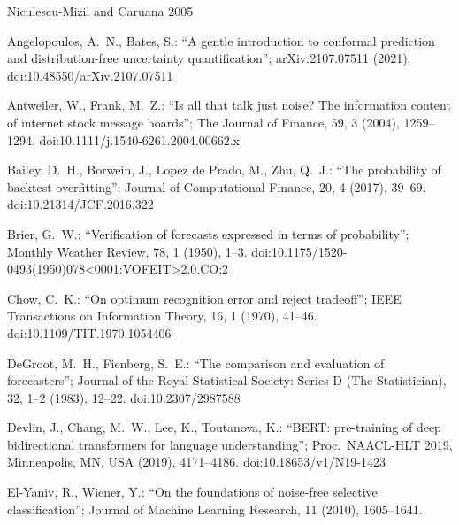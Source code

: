 \documentclass[10pt, a4paper, oneside]{article}
\theoremstyle{definition}
\theoremstyle{plain}
\begin{document}
{\fontsize{9}{11}\selectfont
\begin{thebibliography}{Niculescu-Mizil and Caruana 2005}
\setlength{\itemsep}{1pt}

Angelopoulos, A.\ N., Bates, S.: ``A gentle introduction to conformal prediction and
distribution-free uncertainty quantification''; arXiv:2107.07511 (2021).
doi:10.48550/arXiv.2107.07511

Antweiler, W., Frank, M.\ Z.: ``Is all that talk just noise? The information content of
internet stock message boards''; The Journal of Finance, 59, 3 (2004), 1259--1294.
doi:10.1111/j.1540-6261.2004.00662.x

Bailey, D.\ H., Borwein, J., Lopez de Prado, M., Zhu, Q.\ J.: ``The probability of
backtest overfitting''; Journal of Computational Finance, 20, 4 (2017), 39--69.
doi:10.21314/JCF.2016.322

Brier, G.\ W.: ``Verification of forecasts expressed in terms of probability''; Monthly
Weather Review, 78, 1 (1950), 1--3.
doi:10.1175/1520-0493(1950)078<0001:VOFEIT>2.0.CO;2

Chow, C.\ K.: ``On optimum recognition error and reject tradeoff''; IEEE Transactions
on Information Theory, 16, 1 (1970), 41--46. doi:10.1109/TIT.1970.1054406

DeGroot, M.\ H., Fienberg, S.\ E.: ``The comparison and evaluation of forecasters'';
Journal of the Royal Statistical Society: Series D (The Statistician), 32, 1--2 (1983),
12--22. doi:10.2307/2987588

Devlin, J., Chang, M.\ W., Lee, K., Toutanova, K.: ``BERT: pre-training of deep
bidirectional transformers for language understanding''; Proc.\ NAACL-HLT 2019,
Minneapolis, MN, USA (2019), 4171--4186. doi:10.18653/v1/N19-1423

El-Yaniv, R., Wiener, Y.: ``On the foundations of noise-free selective
classification''; Journal of Machine Learning Research, 11 (2010), 1605--1641.


\end{thebibliography}}
\end{document}
